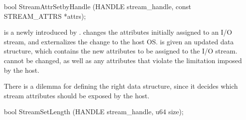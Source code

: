 \begin{paldef}
bool StreamAttrSetbyHandle (HANDLE stream_handle,
                            const STREAM_ATTRS *attrs);
\end{paldef}


 is a \hostapi{} newly introduced by \graphene{}.
 changes the attributes initially assigned to an I/O stream, and externalizes the change to the host OS.
 is given an updated  data structure,
which contains the new attributes to be assigned to the I/O stream.
 cannot be changed, as well as any attributes that violate the limitation imposed by the host.


There is a dilemma for defining the right  data structure, since it decides which stream attributes
should be exposed by the host.











\begin{paldef}
bool StreamSetLength (HANDLE stream_handle, u64 size);
\end{paldef}





